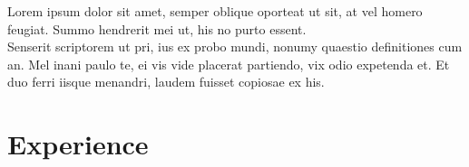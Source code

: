 \documentclass[letterpaper]{twentysecondcv} %
\begin{document}
\makeprofile


Lorem ipsum dolor sit amet, semper oblique oporteat ut sit, at vel homero feugiat. Summo hendrerit mei ut, his no purto essent. \\
Senserit scriptorem ut pri, ius ex probo mundi, nonumy quaestio definitiones cum an. Mel inani paulo te, ei vis vide placerat partiendo, vix odio expetenda et. Et duo ferri iisque menandri, laudem fuisset copiosae ex his.

\section{Experience}
\end{document}
